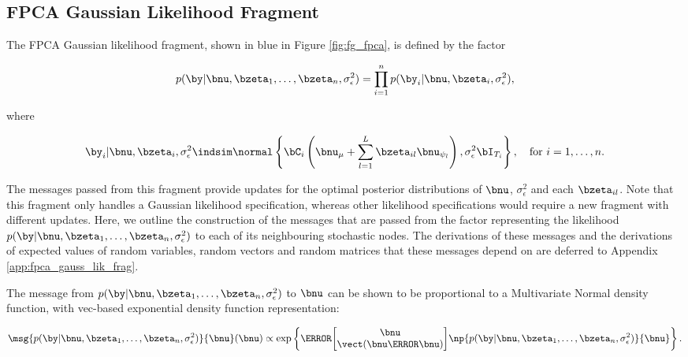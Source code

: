 \documentclass[12pt]{article}
\def\sigsqeps{\sigma^2_{\epsilon}}
\def\numu{\bnu_\mu}
\newcommand\nupsi[1]{\bnu_{\psi_{#1}}}
\theoremstyle{plain}
\theoremstyle{definition}
\theoremstyle{remark}
\begin{document}

\subsection{FPCA Gaussian Likelihood Fragment}
\label{sec:fpca_gauss_lik_frag}

The FPCA Gaussian likelihood fragment, shown in blue in Figure \ref{fig:fg_fpca}, is defined by the factor

\begin{equation}
	p (\by | \bnu, \bzeta_1, \dots, \bzeta_n, \sigsqeps) =
		\prod_{i=1}^n p (\by_i | \bnu, \bzeta_i, \sigsqeps),
\label{fpc_gauss_lik_factorized}
\end{equation}

\noindent where

\begin{equation}
	\by_i | \bnu, \bzeta_i, \sigsqeps \indsim \normal \left\{
		\bC_i \left( \numu + \sum_{l=1}^L \bzeta_{il} \nupsi{l} \right), \sigsqeps \bI_{T_i}
	\right\}, \quad \text{for $i = 1, \dots, n$}.
\label{fpc_gauss_lik_factor}
\end{equation}

\noindent The messages passed from this fragment provide updates for the optimal posterior distributions of
$\bnu$, $\sigsqeps$ and each $\bzeta_{il}$. Note that this fragment only handles a
Gaussian likelihood specification, whereas other likelihood specifications would require a new fragment
with different updates.
Here, we outline the construction of the messages that are passed from the factor representing
the likelihood $p (\by | \bnu, \bzeta_1, \dots, \bzeta_n, \sigsqeps)$ to each of its neighbouring stochastic nodes.
The derivations of these messages and the derivations of expected values of random variables, random vectors
and random matrices that these messages depend on are deferred to Appendix \ref{app:fpca_gauss_lik_frag}.

The message from $p (\by | \bnu, \bzeta_1, \dots, \bzeta_n, \sigsqeps)$ to $\bnu$ can be shown to be
proportional to a Multivariate
Normal density function, with vec-based exponential density function representation:

\begin{equation}
	\msg{p (\by | \bnu, \bzeta_1, \dots, \bzeta_n, \sigsqeps)}{\bnu} (\bnu) \propto
		\exp \left\{
			\T{\begin{bmatrix}
				\bnu \\
				\vect (\bnu \T{\bnu})
			\end{bmatrix}}
			\np{p (\by | \bnu, \bzeta_1, \dots, \bzeta_n, \sigsqeps)}{\bnu}
		\right\}.
\label{msg_lik_nu}
\end{equation}
\end{document}
